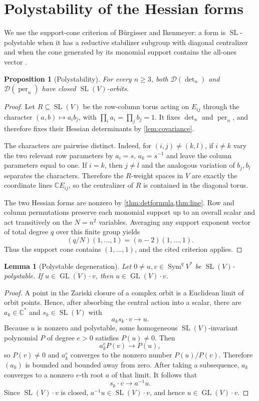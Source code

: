 \documentclass[11pt]{article}
\newtheorem{proposition}[theorem]{Proposition}
\newtheorem{lemma}[theorem]{Lemma}
\theoremstyle{remark}
\DeclareMathOperator{\per}{per}
\DeclareMathOperator{\Sym}{Sym}
\DeclareMathOperator{\GL}{GL}
\DeclareMathOperator{\SL}{SL}
\newcommand{\C}{\mathbb C}
\newcommand{\Dcal}{\mathcal D}
\begin{document}
\section{Polystability of the Hessian forms}\label{sec:polystability}
We use the support-cone criterion of B\"urgisser and Ikenmeyer: a form is $\SL$-polystable when it has a reductive stabilizer subgroup with diagonal centralizer and when the cone generated by its monomial support contains the all-ones vector \cite[Proposition~2.8]{BI}.

\begin{proposition}[Polystability]\label{prop:polystability}
For every $n\geq3$, both $\Dcal(\det_n)$ and $\Dcal(\per_n)$ have closed $\SL(V)$-orbits.
\end{proposition}
\begin{proof}
Let $R\subseteq\SL(V)$ be the row-column torus acting on $E_{ij}$ through the character $(a,b)\mapsto a_i b_j$, with $\prod_i a_i=\prod_j b_j=1$.  It fixes $\det_n$ and $\per_n$, and therefore fixes their Hessian determinants by \cref{lem:covariance}.

The characters are pairwise distinct.  Indeed, for $(i,j)\neq(k,l)$, if $i\neq k$ vary the two relevant row parameters by $a_i=s$, $a_k=s^{-1}$ and leave the column parameters equal to one.  If $i=k$, then $j\neq l$ and the analogous variation of $b_j,b_l$ separates the characters.  Therefore the $R$-weight spaces in $V$ are exactly the coordinate lines $\C E_{ij}$, so the centralizer of $R$ is contained in the diagonal torus.

The two Hessian forms are nonzero by \cref{thm:detformula,thm:line}.  Row and column permutations preserve each monomial support up to an overall scalar and act transitively on the $N=n^2$ variables.  Averaging any support exponent vector of total degree $q$ over this finite group yields
\[
 (q/N)(1,\ldots,1)=(n-2)(1,\ldots,1).
\]
Thus the support cone contains $(1,\ldots,1)$, and the cited criterion applies.
\end{proof}

\begin{lemma}[Polystable degeneration]\label{lem:closedorbit}
Let $0\neq u,v\in\Sym^qV^*$ be $\SL(V)$-polystable.  If $u\in\overline{\GL(V)\cdot v}$, then $u\in\GL(V)\cdot v$.
\end{lemma}
\begin{proof}
A point in the Zariski closure of a complex orbit is a Euclidean limit of orbit points.  Hence, after absorbing the central action into a scalar, there are $a_k\in\C^*$ and $s_k\in\SL(V)$ with
\[
 a_k s_k\cdot v\longrightarrow u.
\]
Because $u$ is nonzero and polystable, some homogeneous $\SL(V)$-invariant polynomial $P$ of degree $e>0$ satisfies $P(u)\neq0$.  Then
\[
 a_k^eP(v)\longrightarrow P(u),
\]
so $P(v)\neq0$ and $a_k^e$ converges to the nonzero number $P(u)/P(v)$.  Therefore $(a_k)$ is bounded and bounded away from zero.  After taking a subsequence, $a_k$ converges to a nonzero $e$-th root $a$ of that limit.  It follows that
\[
 s_k\cdot v\longrightarrow a^{-1}u.
\]
Since $\SL(V)\cdot v$ is closed, $a^{-1}u\in\SL(V)\cdot v$, and hence $u\in\GL(V)\cdot v$.
\end{proof}
\end{document}
